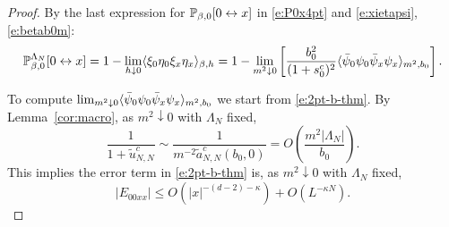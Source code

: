 \documentclass[11pt]{amsart}
\numberwithin{equation}{section}
\numberwithin{theorem}{section}
\newcommand{\conn}{\leftrightarrow}
\newcommand{\1}{{\bf 1}}
\begin{document}
\begin{proof}
By the last expression for
$\P_{\beta,0}[0\conn x]$ in \eqref{e:P0x4pt} and \eqref{e:xietapsi}, \eqref{e:betab0m}:
\begin{equation} \label{e:P0x4ptpf}
  \P_{\beta,0}^{\Lambda_N}[0\conn x]
  = 1-\lim_{h\downarrow 0}\avg{\xi_0\eta_0\xi_x\eta_x}_{\beta,h}
  = 1- \lim_{m^2\downarrow 0}\qa{ \frac{b_0^2}{(1+s_0^c)^2}
    \avg{\bar\psi_0\psi_0\bar\psi_x\psi_x}_{m^{2},b_{0}}}.
\end{equation}

To compute
$\lim_{m^2\downarrow
  0}\langle \bar\psi_0\psi_0\bar\psi_x\psi_x \rangle_{m^{2},b_{0}}$ we start
from \eqref{e:2pt-b-thm}.  By Lemma~\ref{cor:macro},
as $m^2\downarrow 0$ with $\Lambda_N$ fixed,
\begin{equation}
  \frac{1}{1+\tilde u_{N,N}^c} \sim
  \frac{1}{m^{-2}\tilde a_{N,N}^c(b_0,0)}
  =  
  O(\frac{m^2|\Lambda_N|}{b_0}).
\end{equation}
This implies the error term in \eqref{e:2pt-b-thm} is, 
as $m^2\downarrow 0$ with $\Lambda_N$ fixed,
\begin{equation}
  |E_{00xx}|
   \leq O(|x|^{-(d-2)-\kappa}) + O(L^{-\kappa N})
  .
\end{equation}


\end{proof}
\end{document}
